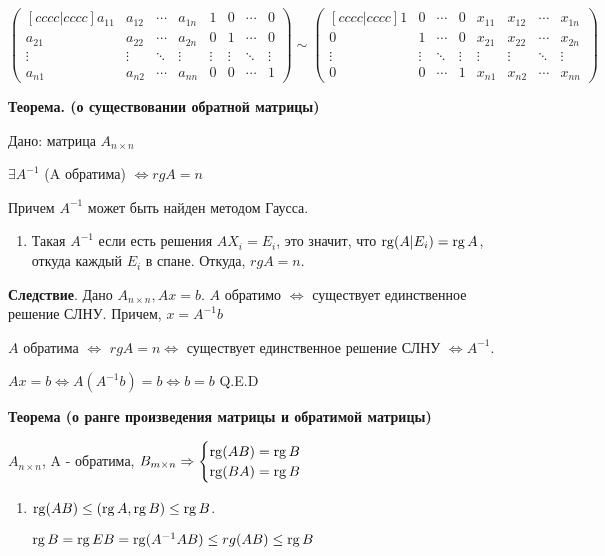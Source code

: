 \(
\begin{pmatrix}[cccc|cccc]
    a_{11} & a_{12} & \cdots & a_{1n} & 1      & 0      & \cdots & 0      \\
    a_{21} & a_{22} & \cdots & a_{2n} & 0      & 1      & \cdots & 0      \\
    \vdots & \vdots & \ddots & \vdots & \vdots & \vdots & \ddots & \vdots \\
    a_{n1} & a_{n2} & \cdots & a_{nn} & 0      & 0      & \cdots & 1
\end{pmatrix} \sim
\begin{pmatrix}[cccc|cccc]
    1      & 0      & \cdots & 0      & x_{11} & x_{12} & \cdots & x_{1n} \\
    0      & 1      & \cdots & 0      & x_{21} & x_{22} & \cdots & x_{2n} \\
    \vdots & \vdots & \ddots & \vdots & \vdots & \vdots & \ddots & \vdots \\
    0      & 0      & \cdots & 1      & x_{n1} & x_{n2} & \cdots & x_{nn}
\end{pmatrix}
\)

\textbf{Теорема. (о существовании обратной матрицы)}

Дано: матрица \(A_{n \times n}\)

\(\exists A^{-1}\) (A обратима) \(\Leftrightarrow rg A = n\)

Причем \(A^{-1}\) может быть найден методом Гаусса.
\begin{enumerate}
    \item[] \prooff{}
          Такая $A^{-1}$ если есть решения $AX_i = E_i$, это значит, что $\operatorname{rg}(A|E_i) = \operatorname{rg} A$, откуда каждый $E_i$ в спане. Откуда, $rg A = n$.
\end{enumerate}

\textbf{Следствие}. Дано \(A_{n \times n}, Ax=b\). \(A\) обратимо \(\Leftrightarrow\) существует единственное решение СЛНУ. Причем, \(x = A^{-1} b\)

\(A\) обратима \(\Leftrightarrow\) \(rg A = n \Leftrightarrow\) существует единственное решение СЛНУ \(\Leftrightarrow A^{-1}\).

\(Ax = b \Leftrightarrow A (A^{-1}b) = b \Leftrightarrow b = b\) Q.E.D

\textbf{Теорема (о ранге произведения матрицы и обратимой матрицы)}

\(A_{n\times n}\), A - обратима, \(B_{m \times n} \Rightarrow
\begin{cases}
    \operatorname{rg}(AB) = \operatorname{rg} B \\
    \operatorname{rg}(BA) = \operatorname{rg} B
\end{cases}
\)
\begin{enumerate}
    \item[] \prooff{}
          $\operatorname{rg}(AB)\leq (\operatorname{rg} A, \operatorname{rg} B)\leq \operatorname{rg} B$.

          $\operatorname{rg} B = \operatorname{rg} EB = \operatorname{rg} (A^{-1}AB)\leq rg(AB) \leq \operatorname{rg} B$
\end{enumerate}


